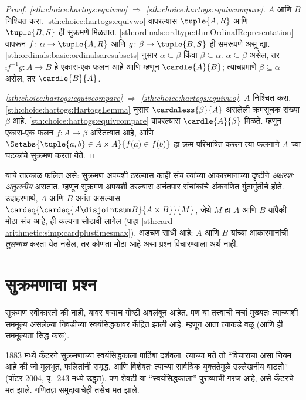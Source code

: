 \begin{proof}
\emph{\ref{sth:choice:hartogs:equivwo} $\Rightarrow$ \ref{sth:choice:hartogs:equivcompare}.} $A$ आणि $B$ निश्चित करा. \ref{sth:choice:hartogs:equivwo} वापरल्यास $\tuple{A, R}$ आणि $\tuple{B, S}$ ही सुक्रमणे मिळतात. \ref{sth:ordinals:ordtype:thmOrdinalRepresentation} वापरून $f \colon
\alpha \to \tuple{A, R}$ आणि $g \colon \beta \to \tuple{B, S}$ ही समरूपणे असू द्या. \ref{sth:ordinals:basic:ordinalsaresubsets} नुसार $\alpha \subseteq \beta$ किंवा $\beta \subseteq \alpha$. $\alpha \subseteq \beta$ असेल, तर $\comp{f^{-1}}{g} \colon A \to B$ हे एकास-एक फलन आहे आणि म्हणून
$\cardle{A}{B}$; त्याचप्रमाणे $\beta \subseteq \alpha$ असेल, तर $\cardle{B}{A}$.

\emph{\ref{sth:choice:hartogs:equivcompare} $\Rightarrow$ \ref{sth:choice:hartogs:equivwo}.} $A$ निश्चित करा. \ref{sth:choice:hartogs:HartogsLemma} नुसार $\cardnless{\beta}{A}$ असलेली क्रमसूचक संख्या $\beta$ आहे. \ref{sth:choice:hartogs:equivcompare} वापरल्यास $\cardle{A}{\beta}$ मिळते. म्हणून एकास-एक फलन $f \colon A \to
\beta$ अस्तित्वात आहे, आणि $\Setabs{\tuple{a, b} \in A \times A}{f(a)
\in f(b)}$ हा क्रम परिभाषित करून त्या फलनाने $A$ च्या घटकांचे सुक्रमण करता येते.
\end{proof}
\noindent
याचे तात्काळ फलित असे: सुक्रमण अपयशी ठरल्यास काही संच त्यांच्या आकारमानाच्या दृष्टीने \emph{अक्षरशः अतुलनीय} असतात. म्हणून सुक्रमण अपयशी ठरल्यास अनंतपार संचांकांचे अंकगणित गुंतागुंतीचे होते. उदाहरणार्थ, $A$ आणि $B$ अनंत असल्यास $\cardeq{\cardeq{A \disjointsum B}{A \times
B}}{M}$, जेथे $M$ हा $A$ आणि $B$ यांपैकी मोठा संच आहे, ही कल्पना सोडावी लागेल (पाहा \ref{sth:card-arithmetic:simp:cardplustimesmax}). अडचण साधी आहे: $A$ आणि $B$ यांच्या आकारमानांची \emph{तुलनाच} करता येत नसेल, तर कोणता मोठा आहे असा प्रश्न विचारण्याला अर्थ नाही.







\section{सुक्रमणाचा प्रश्न}\label{sth:choice:woproblem:sec}

सुक्रमण स्वीकारतो की नाही, यावर बऱ्याच गोष्टी अवलंबून आहेत. पण या तत्त्वाची चर्चा मुख्यतः त्याच्याशी सममूल्य असलेल्या निवडीच्या स्वयंसिद्धकावर केंद्रित झाली आहे. म्हणून आता त्याकडे वळू (आणि ही सममूल्यता सिद्ध करू).

1883 मध्ये कँटरने सुक्रमणाच्या स्वयंसिद्धकाला पाठिंबा दर्शवला. त्याच्या मते तो “विचाराचा असा नियम आहे की जो मूलभूत, फलितांनी समृद्ध, आणि विशेषतः त्याच्या सार्वत्रिक युक्ततेमुळे उल्लेखनीय वाटतो” (पॉटर 2004, पृ.~243 मध्ये उद्धृत). पण शेवटी या “स्वयंसिद्धकाला” पुराव्याची गरज आहे, असे कँटरचे मत झाले. गणितज्ञ समुदायाचेही तसेच मत झाले.

